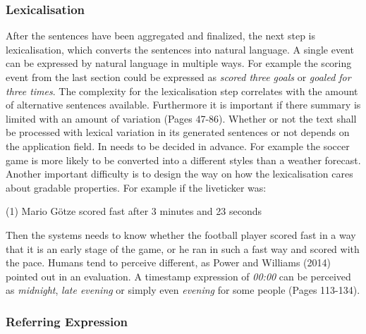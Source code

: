 \subsubsection{Lexicalisation}\label{ss:lex}

After the sentences have been aggregated and finalized, the next step is lexicalisation, which converts the sentences into natural language. A single event can be expressed by natural language in multiple ways. For example the scoring event from the last section could be expressed as \textit{scored three goals} or \textit{goaled for three times}. The complexity for the lexicalisation step correlates with the amount of alternative sentences available. Furthermore it is important if there summary is limited with an amount of variation \cite{Theune} (Pages 47-86). Whether or not the text shall be processed with lexical variation in its generated sentences or not depends on the application field. In needs to be decided in advance. For example the soccer game is more likely to be converted into a different styles than a weather forecast. Another important difficulty is to design the way on how the lexicalisation cares about gradable properties. For example if the liveticker was:

\begin{tcolorbox}
	\begin{center}
		(1) Mario Götze scored fast after 3 minutes and 23 seconds
	\end{center}
\end{tcolorbox}

Then the systems needs to know whether the football player scored fast in a way that it is an early stage of the game, or he ran in such a fast way and scored with the pace. Humans tend to perceive different, as Power and Williams (2014) pointed out in an evaluation. A timestamp expression of \textit{00:00} can be perceived as \textit{midnight}, \textit{late evening} or simply even \textit{evening} for some people \cite{Power} (Pages 113-134).


\subsubsection{Referring Expression}

